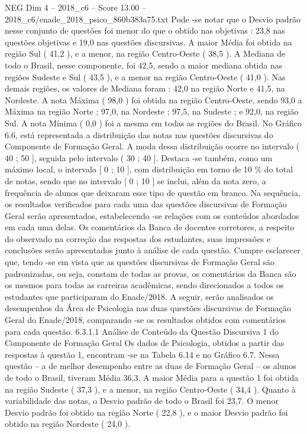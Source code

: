 \begin{textsample}{NEG Dim 4 – 2018\_c6 – Score 13.00 – 2018\_c6/enade\_2018\_psico\_860b383a75.txt}
Pode -se notar que o Desvio padrão nesse conjunto de questões foi menor do que o obtido nas objetivas : 23,8 nas questões objetivas e 19,0 nas questões discursivas.
A maior Média foi obtida na região Sul ( 41,2 ), e a menor, na região Centro-Oeste ( 38,5 ).
A Mediana de todo o Brasil, nesse componente, foi 42,5, sendo a maior mediana obtida nas regiões Sudeste e Sul ( 43,5 ), e a menor na região Centro-Oeste ( 41,0 ).
Nas demais regiões, os valores de Mediana foram : 42,0 na região Norte e 41,5, na Nordeste.
A nota Máxima ( 98,0 ) foi obtida na região Centro-Oeste, sendo 93,0 a Máxima na região Norte ; 97,0, na Nordeste ; 97,5, na Sudeste ; e 92,0, na região Sul.
A nota Mínima ( 0,0 ) foi a mesma em todas as regiões do Brasil.
No Gráfico 6.6, está representada a distribuição das notas nas questões discursivas do Componente de Formação Geral.
A moda dessa distribuição ocorre no intervalo ( 40 ; 50 ], seguida pelo intervalo ( 30 ; 40 ].
Destaca -se também, como um máximo local, o intervalo [ 0 ; 10 ], com distribuição em torno de 10 \% do total de notas, sendo que no intervalo [ 0 ; 10 ] se inclui, além da nota zero, a frequência de alunos que deixaram esse tipo de questão em branco.
Na sequência, os resultados verificados para cada uma das questões discursivas de Formação Geral serão apresentados, estabelecendo -se relações com os conteúdos abordados em cada uma delas.
Os comentários da Banca de docentes corretores, a respeito do observado na correção das respostas dos estudantes, suas impressões e conclusões serão apresentados junto à análise de cada questão.
Cumpre esclarecer que, tendo -se em vista que as questões discursivas de Formação Geral são padronizadas, ou seja, constam de todas as provas, os comentários da Banca são os mesmos para todas as carreiras acadêmicas, sendo direcionados a todos os estudantes que participaram do Enade/2018.
A seguir, serão analisados os desempenhos da Área de Psicologia nas duas questões discursivas de Formação Geral do Enade/2018, comparando -se os resultados obtidos com comentários para cada questão. 6.3.1.1 Análise de Conteúdo da Questão Discursiva 1 do Componente de Formação Geral Os dados de Psicologia, obtidos a partir das respostas à questão 1, encontram -se na Tabela 6.14 e no Gráfico 6.7.
Nessa questão – a de melhor desempenho entre as duas de Formação Geral – os alunos de todo o Brasil, tiveram Média 36,3.
A maior Média para a questão 1 foi obtida na região Sudeste ( 37,3 ), e a menor, na região Centro-Oeste ( 34,4 ).
Quanto à variabilidade das notas, o Desvio padrão de todo o Brasil foi 23,7.
O menor Desvio padrão foi obtido na região Norte ( 22,8 ), e o maior Desvio padrão foi obtido na região Nordeste ( 24,0 ).

\end{textsample}
